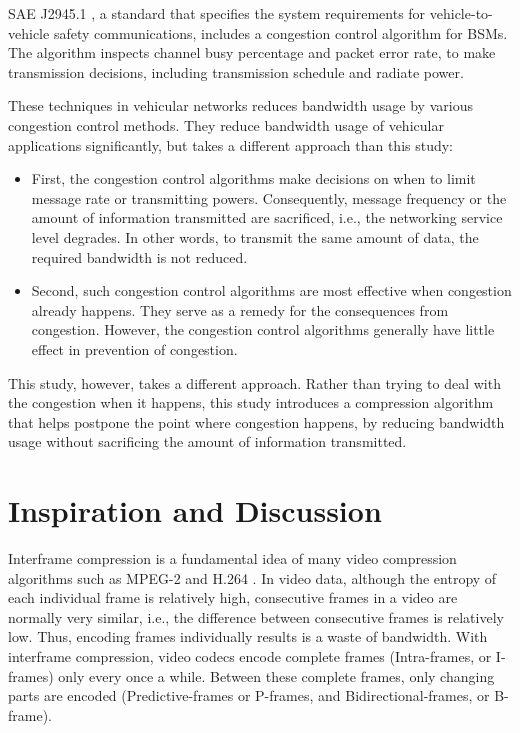 \documentclass[12pt]{report}
\begin{document}
SAE J2945.1 \cite{sae2016j29451}, a standard that specifies the system requirements for vehicle-to-vehicle safety communications, includes a congestion control algorithm for BSMs. The algorithm inspects channel busy percentage and packet error rate, to make transmission decisions, including transmission schedule and radiate power.

These techniques in vehicular networks reduces bandwidth usage by various congestion control methods. They reduce bandwidth usage of vehicular applications significantly, but takes a different approach than this study:

\begin{itemize}
  \item First, the congestion control algorithms make decisions on when to limit message rate or transmitting powers. Consequently, message frequency or the amount of information transmitted are sacrificed, i.e., the networking service level degrades. In other words, to transmit the same amount of data, the required bandwidth is not reduced.
  \item Second, such congestion control algorithms are most effective when congestion already happens. They serve as a remedy for the consequences from congestion. However, the congestion control algorithms generally have little effect in prevention of congestion.
\end{itemize}

This study, however, takes a different approach. Rather than trying to deal with the congestion when it happens, this study introduces a compression algorithm that helps postpone the point where congestion happens, by reducing bandwidth usage without sacrificing the amount of information transmitted.

\section{Inspiration and Discussion}

Interframe compression is a fundamental idea of many video compression algorithms such as MPEG-2 \cite{le1991mpeg} and H.264 \cite{wiegand2003h264}. In video data, although the entropy of each individual frame is relatively high, consecutive frames in a video are normally very similar, i.e., the difference between consecutive frames is relatively low. Thus, encoding frames individually results is a waste of bandwidth. With interframe compression, video codecs encode complete frames (Intra-frames, or I-frames) only every once a while. Between these complete frames, only changing parts are encoded (Predictive-frames or P-frames, and Bidirectional-frames, or B-frame).
\end{document}
